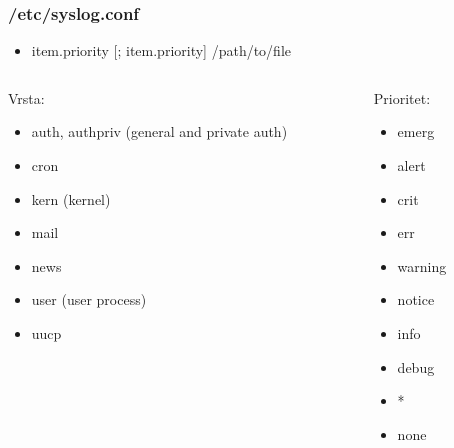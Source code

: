\documentclass[t,table,usenames,dvipsnames]{beamer}
\begin{document}
\begin{frame}
    \frametitle{/etc/syslog.conf}
    \begin{itemize}
        \item item.priority [; item.priority]   /path/to/file
    \end{itemize}

    \begin{columns}
        \begin{column}{0.5\textwidth}
           Vrsta: \\
            \begin{itemize}
                \item auth, authpriv (general and private auth)
                \item cron
                \item kern (kernel)
                \item mail
                \item news
                \item user (user process)
                \item uucp
            \end{itemize}
        \end{column}
        \begin{column}{0.5\textwidth}  %
            Prioritet: \\
            \begin{itemize}
                \item emerg
                \item alert
                \item crit
                \item err
                \item warning
                \item notice
                \item info
                \item debug
                \item *
                \item none
            \end{itemize}
        \end{column}
        \end{columns}

\end{frame}
\end{document}

